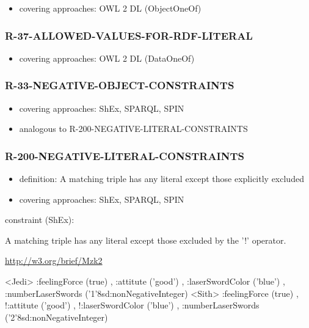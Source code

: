\documentclass{llncs}
\begin{document}
\begin{itemize}
	\item covering approaches:  OWL 2 DL (ObjectOneOf) 
\end{itemize}

\subsubsection{R-37-ALLOWED-VALUES-FOR-RDF-LITERAL}

\begin{itemize}
	\item covering approaches:  OWL 2 DL (DataOneOf) 
\end{itemize}

\subsubsection{R-33-NEGATIVE-OBJECT-CONSTRAINTS}

\begin{itemize}
	\item covering approaches:  ShEx, SPARQL, SPIN
	\item analogous to R-200-NEGATIVE-LITERAL-CONSTRAINTS
\end{itemize}

\subsubsection{R-200-NEGATIVE-LITERAL-CONSTRAINTS}

\begin{itemize}
	\item definition: A matching triple has any literal except those explicitly excluded
	\item covering approaches:  ShEx, SPARQL, SPIN
\end{itemize}

constraint (ShEx):

A matching triple has any literal except those excluded by the '!' operator.

\url{http://w3.org/brief/Mzk2}

\begin{ex}
<Jedi> {
    :feelingForce (true) ,
    :attitute ('good') ,
    :laserSwordColor ('blue') ,
    :numberLaserSwords ('1'^^xsd:nonNegativeInteger) }
<Sith> {
    :feelingForce (true) ,
   !:attitute ('good') ,
   !:laserSwordColor ('blue') ,
    :numberLaserSwords ('2'^^xsd:nonNegativeInteger) }
\end{ex}
\end{document}
